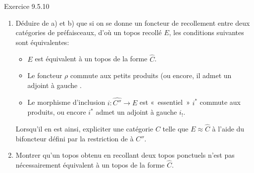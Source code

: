 \documentclass[10pt]{../fichiers-configuration-latex/smfart}
\begin{document}
\begin{enonce*}[remark]{Exercice 9.5.10}
\begin{enumerate}
\item Déduire de a) et b) que si on se donne un foncteur de
recollement  entre deux catégories de
préfaisceaux,
d'où un topos recollé $E$, les conditions suivantes sont
équivalentes:
\begin{itemize}
\item[(i)] $E$ est équivalent à un topos de la forme $\widehat{C}$.

\item[(ii)] Le foncteur $\rho$ commute aux petits produits (ou encore, il
admet un adjoint à gauche \sisi{}{)}.

\item[(iii)] Le morphisme d'inclusion $i:\widehat{C''}\rightarrow E$ est « essentiel »  \ie $i^{\ast}$ commute aux produits, ou encore
$i^{\ast}$ admet un adjoint à gauche $i_{!}$.
\end{itemize}
Lorsqu'il en est ainsi, expliciter une catégorie $C$ telle que
$E\approx \widehat{C}$ à l'aide du bifoncteur 
défini par la restriction de  à $C''$.

\item Montrer qu'un topos obtenu en recollant deux topos ponctuels
n'est pas nécessairement équivalent à un topos de la forme
$\widehat{C}$.
\end{enumerate}
\end{enonce*}
\end{document}
